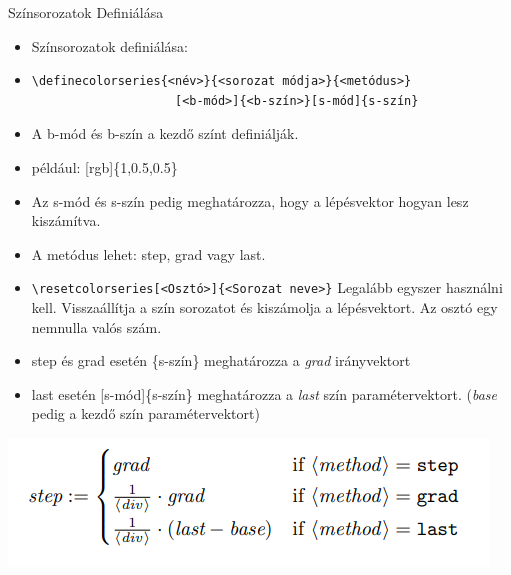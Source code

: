 \documentclass[aspectratio=1610, dvipsnames, xcolor=table]{beamer}
\begin{document}
    
    \begin{frame}[fragile]{Színsorozatok Definiálása}
        \begin{itemize}
            \item Színsorozatok definiálása: 
            \item \begin{verbatim}\definecolorseries{<név>}{<sorozat módja>}{<metódus>}
                    [<b-mód>]{<b-szín>}[s-mód]{s-szín}\end{verbatim}
            \item A b-mód és b-szín a kezdő színt definiálják.
            \item például: [rgb]\{1,0.5,0.5\}
            \item Az s-mód és s-szín pedig meghatározza, hogy a lépésvektor hogyan lesz kiszámítva.
            \item A metódus lehet: step, grad vagy last.
        \end{itemize}
    \end{frame}

    \begin{frame}[fragile]
        \begin{itemize}
            \item \verb!\resetcolorseries[<Osztó>]{<Sorozat neve>}! Legalább egyszer használni kell. Visszaállítja a szín sorozatot és kiszámolja a lépésvektort. Az osztó egy nemnulla valós szám.
            \item step és grad esetén \{s-szín\} meghatározza a \textit{grad} irányvektort
            \item last esetén [s-mód]\{s-szín\} meghatározza a \textit{last} szín paramétervektort. (\textit{base} pedig a kezdő szín paramétervektort)    
        \end{itemize}
        \begin{center}
            \includegraphics[scale=0.8]{img/lepesvektor.png}
        \end{center}
    \end{frame}
\end{document}
